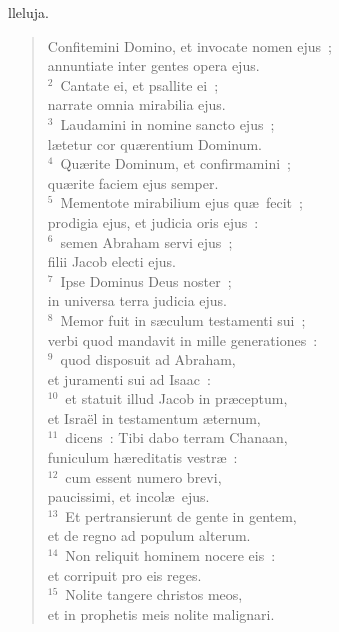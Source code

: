 \bchapter
{}lleluja. \begin{flushleft}\begin{verse}\vspace{6pt}Confitemini Domino, et invocate nomen ejus~;\\ annuntiate inter gentes opera ejus.\\
${}^{2}$~Cantate ei, et psallite ei~;\\ narrate omnia mirabilia ejus.\\
${}^{3}$~Laudamini in nomine sancto ejus~;\\ l\ae tetur cor qu\ae rentium Dominum.\\
${}^{4}$~Qu\ae rite Dominum, et confirmamini~;\\ qu\ae rite faciem ejus semper.\\
${}^{5}$~Mementote mirabilium ejus qu\ae\ fecit~;\\ prodigia ejus, et judicia oris ejus~:\\
${}^{6}$~semen Abraham servi ejus~;\\ filii Jacob electi ejus.\\
${}^{7}$~Ipse Dominus Deus noster~;\\ in universa terra judicia ejus.\\
${}^{8}$~Memor fuit in s\ae culum testamenti sui~;\\ verbi quod mandavit in mille generationes~:\\
${}^{9}$~quod disposuit ad Abraham,\\ et juramenti sui ad Isaac~:\\
${}^{10}$~et statuit illud Jacob in pr\ae ceptum,\\ et Isra\"el in testamentum \ae ternum,\\
${}^{11}$~dicens~: Tibi dabo terram Chanaan,\\ funiculum h\ae reditatis vestr\ae~:\\
${}^{12}$~cum essent numero brevi,\\ paucissimi, et incol\ae\ ejus.\\
${}^{13}$~Et pertransierunt de gente in gentem,\\ et de regno ad populum alterum.\\
${}^{14}$~Non reliquit hominem nocere eis~:\\ et corripuit pro eis reges.\\
${}^{15}$~Nolite tangere christos meos,\\ et in prophetis meis nolite malignari.\\

\end{verse}
\end{flushleft}
